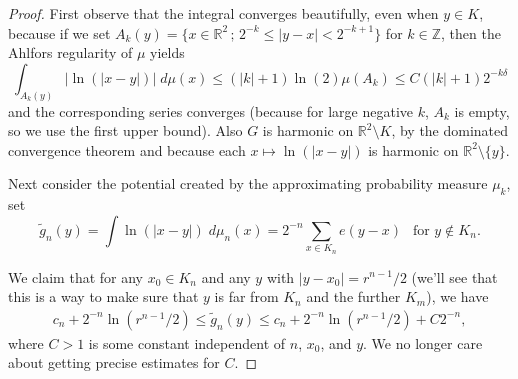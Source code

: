 \documentclass[JEP,XML,SOM,Unicode,published]{cedram}
\let\sm\setminus
\numberwithin{equation}{section}
\theoremstyle{plain}
\theoremstyle{definition}
\newcommand{\R}{\mathbb{R}}
\let\sm\setminus
\newcommand{\R}{\mathbb{R}}
\newcommand{\bZ}{\mathbb{Z}}
\begin{document}
\begin{proof}

First observe that the integral converges beautifully, even when $y \in K$, because if we set
$A_k(y) = \big\{x \in \R^2 \, ; \, 2^{-k} \leq |y-x| < 2^{-k+1} \big\}$
for $k \in \bZ$, then the Ahlfors regularity of $\mu$ yields
\begin{equation} \label{3b2}
\int_{A_k(y)} |\ln(|x-y|)| \; d\mu(x) \leq (|k|+1) \ln(2) \mu(A_k) \leq C (|k|+1) 2^{-k \delta}
\end{equation}
and the corresponding series converges (because for large negative $k$, $A_k$ is empty, so we use the first upper bound).
Also $G$ is harmonic on $\R^2 \sm K$, by the dominated convergence theorem and because each
$x \mapsto \ln(|x-y|)$ is harmonic on $\R^2 \sm \{ y \}$.

Next consider the potential created by the approximating probability measure $\mu_k$, \ie set
\begin{equation} \label{3b3}
\tilde{g}_n(y) = \int \ln(|x-y|) \; d\mu_n(x) = 2^{-n} \sum_{x \in K_n} e(y-x)
\ \ \text{ for } y\notin K_n.
\end{equation}

We claim that for any $x_0 \in K_n$ and any $y$ with $|y-x_0| = r^{n-1}/2$
(we'll see that this is a way to make sure that $y$ is far from $K_n$ and the further
$K_m$), we have
\begin{align}
c_n + 2^{-n}\ln (r^{n-1}/2) \le \tilde{g}_n(y) \le c_n + 2^{-n}\ln (r^{n-1}/2) + C 2^{-n}, \label{ga1}
\end{align}
where $C >1$ is some constant independent of $n$, $x_0$, and $y$.
We no longer care about getting precise estimates for $C$.


\end{proof}
\end{document}
